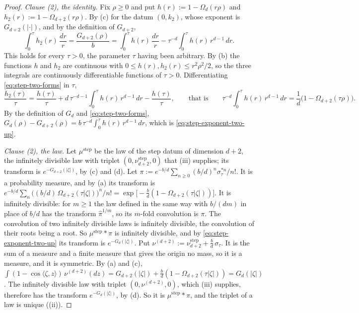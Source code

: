 \begin{proof}
\emph{Clause (2), the identity.} Fix $\rho \ge 0$ and put $h(r) := 1 - \Omega_d(r\rho)$ and
$h_2(r) := 1 - \Omega_{d+2}(r\rho)$. By (c) for the datum $(0,k_2)$, whose exponent is
$G_{d+2}(|\cdot|)$, and by the definition of $G_{d+2}$,
\begin{equation}\label{eq:step-two-forms}
  \int_0^\tau h_2(r)\,\frac{dr}{r} = \frac{G_{d+2}(\rho)}{b}
   = \int_0^\tau h(r)\,\frac{dr}{r} - \tau^{-d}\int_0^\tau h(r)\,r^{d-1}\,dr .
\end{equation}
This holds for every $\tau > 0$, the parameter $\tau$ having been arbitrary. By (b) the
functions $h$ and $h_2$ are continuous with $0 \le h(r), h_2(r) \le r^2\rho^2/2$, so the three
integrals are continuously differentiable functions of $\tau > 0$. Differentiating
\ref{eq:step-two-forms} in $\tau$,
\[
  \frac{h_2(\tau)}{\tau} = \frac{h(\tau)}{\tau} + d\,\tau^{-d-1}\int_0^\tau h(r)\,r^{d-1}\,dr
     - \frac{h(\tau)}{\tau} ,
  \qquad\text{that is}\qquad
  \tau^{-d}\int_0^\tau h(r)\,r^{d-1}\,dr = \frac{1}{d}\bigl(1 - \Omega_{d+2}(\tau\rho)\bigr) .
\]
By the definition of $G_d$ and \ref{eq:step-two-forms},
$G_d(\rho) - G_{d+2}(\rho) = b\,\tau^{-d}\int_0^\tau h(r)\,r^{d-1}\,dr$, which is
\ref{eq:step-exponent-two-up}.

\emph{Clause (2), the law.} Let $\mu^{\mathrm{step}}$ be the law of the step datum of dimension
$d + 2$, the infinitely divisible law with triplet $(0,\nu^{\mathrm{step}}_{d+2},0)$ that
(iii) supplies; its transform is $e^{-G_{d+2}(|\zeta|)}$, by (c) and (d). Let
$\pi := e^{-b/d}\sum_{n \ge 0}(b/d)^n\sigma_\tau^{*n}/n!$. It is a probability measure, and by
(a) its transform is
$e^{-b/d}\sum_n\bigl((b/d)\,\Omega_{d+2}(\tau|\zeta|)\bigr)^n/n!
= \exp\bigl[-\tfrac{b}{d}(1 - \Omega_{d+2}(\tau|\zeta|))\bigr]$. It is infinitely divisible: for
$m \ge 1$ the law defined in the same way with $b/(dm)$ in place of $b/d$ has the transform
$\widehat\pi^{1/m}$, so its $m$-fold convolution is $\pi$. The convolution of two infinitely
divisible laws is infinitely divisible, the convolution of their roots being a root. So
$\mu^{\mathrm{step}} * \pi$ is infinitely divisible, and by \ref{eq:step-exponent-two-up} its
transform is $e^{-G_d(|\zeta|)}$. Put
$\nu^{(d+2)} := \nu^{\mathrm{step}}_{d+2} + \tfrac{b}{d}\,\sigma_\tau$. It is the sum of a
\Levy{} measure and a finite measure that gives the origin no mass, so it is a \Levy{} measure,
and it is symmetric. By (a) and (c),
$\int(1 - \cos\langle\zeta,z\rangle)\,\nu^{(d+2)}(dz) = G_{d+2}(|\zeta|)
+ \tfrac{b}{d}(1 - \Omega_{d+2}(\tau|\zeta|)) = G_d(|\zeta|)$. The infinitely divisible law with
triplet $(0,\nu^{(d+2)},0)$, which (iii) supplies, therefore has the transform
$e^{-G_d(|\zeta|)}$, by (d). So it is $\mu^{\mathrm{step}} * \pi$, and the triplet of a law is
unique ((ii)).


\end{proof}
